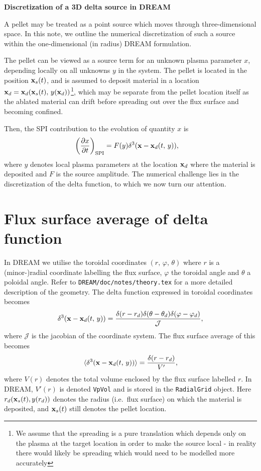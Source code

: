 \documentclass[11pt,a4paper]{article}
\renewcommand{\b}[1]{\ensuremath{ {\bf #1 } }}
\begin{document}
\begin{center}
\Large \bf Discretization of a 3D delta source in DREAM
\end{center}

A pellet may be treated as a point source which moves through three-dimensional space. In this note, we outline the numerical discretization of such a source within the one-dimensional (in radius) DREAM formulation.

The pellet can be viewed as a source term for an unknown plasma parameter $x$, depending locally on all unknowns $y$ in the system. The pellet is located in the position $\b{x}_s(t)$, and is assumed to deposit material in a location $\b{x}_d = \b{x}_d(\b{x}_s(t),\,y(\b{x}_d))$\footnote{We assume that the spreading is a pure translation which depends only on the plasma at the target location in order to make the source local - in reality there would likely be spreading which would need to be modelled more accurately}, which may be separate from the pellet location itself as the ablated material can drift before spreading out over the flux surface and becoming confined. 

Then, the SPI contribution to the evolution of quantity $x$ is
\begin{align}
\left(\frac{\partial x}{\partial t}\right)_\mathrm{SPI} &= F(y) \delta^3( \b{x} - \b{x}_d(t,\,y)),
\end{align}
where $y$ denotes local plasma parameters at the location $\b{x}_d$ where the material is deposited and $F$ is the source amplitude.  The numerical challenge lies in the discretization of the delta function, to which we now turn our attention.

\section*{Flux surface average of delta function}
In DREAM we utilise the toroidal coordinates $(r,\,\varphi,\,\theta)$ where $r$ is a (minor-)radial coordinate labelling the flux surface, $\varphi$ the toroidal angle and $\theta$ a poloidal angle. Refer to \texttt{DREAM/doc/notes/theory.tex} for a more detailed description of the geometry.  The delta function expressed in toroidal coordinates becomes
\begin{align}
\delta^3( \b{x} - \b{x}_d(t,\,y)) = \frac{\delta(r-r_d)\delta(\theta-\theta_d)\delta(\varphi - \varphi_d)}{\mathcal{J}},
\end{align}
where $\mathcal{J}$ is the jacobian of the coordinate system. The flux surface average of this becomes
\begin{align}
\langle\delta^3( \b{x} - \b{x}_d(t,\,y))\rangle = \frac{\delta(r-r_d)}{V'},
\end{align}
where $V(r)$ denotes the total volume enclosed by the flux surface labelled $r$. In DREAM, $V'(r)$ is denoted \texttt{VpVol} and is stored in the \texttt{RadialGrid} object. Here $r_d(\b{x}_s(t), y(r_d))$ denotes the radius (i.e.~flux surface) on which the material is deposited, and $\b{x}_s(t)$ still denotes the pellet location.
\end{document}
